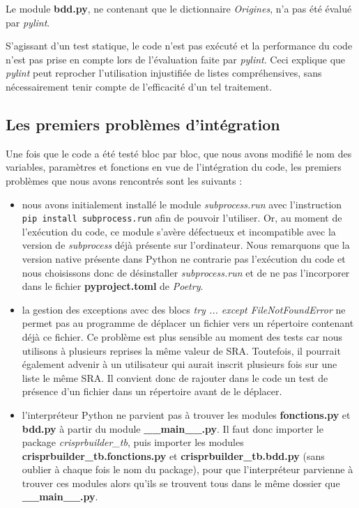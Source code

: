 \documentclass[twoside,a4paper,11pt,frenchb,openany]{report}
\begin{document}
Le module \textbf{bdd.py}, ne contenant que le dictionnaire \textit{Origines}, n'a pas été évalué par \textit{pylint}.

S'agissant d'un test statique, le code n'est pas exécuté et la performance du code n'est pas prise en compte lors de l'évaluation faite par \textit{pylint}. Ceci explique que \textit{pylint} peut reprocher l'utilisation injustifiée de listes compréhensives, sans nécessairement tenir compte de l'efficacité d'un tel traitement.




\subsection{Les premiers problèmes d'intégration}

Une fois que le code a été testé bloc par bloc, que nous avons modifié le nom des variables, paramètres et fonctions en vue de l'intégration du code, les premiers problèmes que nous avons rencontrés sont les suivants :  
\begin{itemize}
\item nous avons initialement installé le module \textit{subprocess.run} avec l'instruction \\\texttt{pip install subprocess.run} afin de pouvoir l'utiliser. Or, au moment de l'exécution du code, ce module s'avère défectueux et incompatible avec la version de \textit{subprocess} déjà présente sur l'ordinateur. Nous remarquons que la version native présente dans Python ne contrarie pas l'exécution du code et nous choisissons donc de désinstaller \textit{subprocess.run} et de ne pas l'incorporer dans le fichier \textbf{pyproject.toml} de \textit{Poetry}.
\item la gestion des exceptions avec des blocs \textit{try ... except FileNotFoundError} ne permet pas au programme de déplacer un fichier vers un répertoire contenant déjà ce fichier. Ce problème est plus sensible au moment des tests car nous utilisons à plusieurs reprises la même valeur de SRA. Toutefois, il pourrait également advenir à un utilisateur qui aurait inscrit plusieurs fois sur une liste le même SRA. Il convient donc de rajouter dans le code un test de présence d'un fichier dans un répertoire avant de le déplacer.
\item l'interpréteur Python ne parvient pas à trouver les modules \textbf{fonctions.py} et \textbf{bdd.py} à partir du module \textbf{\_\_main\_\_.py}. Il faut donc importer le package \textit{crisprbuilder\_tb}, puis importer les modules \textbf{crisprbuilder\_tb.fonctions.py} et \textbf{crisprbuilder\_tb.bdd.py} (sans oublier à chaque fois le nom du package), pour que l'interpréteur parvienne à trouver ces modules alors qu'ils se trouvent tous dans le même dossier que \textbf{\_\_main\_\_.py}.
\end{itemize}
\end{document}
